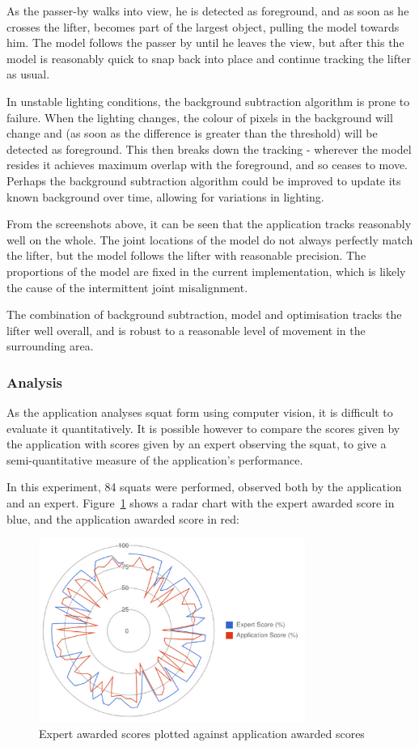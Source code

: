 As the passer-by walks into view, he is detected as foreground, and as soon as he crosses the lifter, becomes part of the largest object, pulling the model towards him. The model follows the passer by until he leaves the view, but after this the model is reasonably quick to snap back into place and continue tracking the lifter as usual.

In unstable lighting conditions, the background subtraction algorithm is prone to failure. When the lighting changes, the colour of pixels in the background will change and (as soon as the difference is greater than the threshold) will be detected as foreground. This then breaks down the tracking - wherever the model resides it achieves maximum overlap with the foreground, and so ceases to move. Perhaps the background subtraction algorithm could be improved to update its known background over time, allowing for variations in lighting.

From the screenshots above, it can be seen that the application tracks reasonably well on the whole. The joint locations of the model do not always perfectly match the lifter, but the model follows the lifter with reasonable precision. The proportions of the model are fixed in the current implementation, which is likely the cause of the intermittent joint misalignment.

The combination of background subtraction, model and optimisation tracks the lifter well overall, and is robust to a reasonable level of movement in the surrounding area.

\subsubsection{Analysis}
\label{sec:analysis_eval}

As the application analyses squat form using computer vision, it is difficult to evaluate it quantitatively. It is possible however to compare the scores given by the application with scores given by an expert observing the squat, to give a semi-quantitative measure of the application's performance.

In this experiment, 84 squats were performed, observed both by the application and an expert. Figure~\ref{fig:scorediff} shows a radar chart with the expert awarded score in blue, and the application awarded score in red:

\begin{figure}[H]
    \centering
	\includegraphics[height=6cm]{evaluation/images/scores_difference}
\caption{Expert awarded scores plotted against application awarded scores}
\label{fig:scorediff}
\end{figure}

